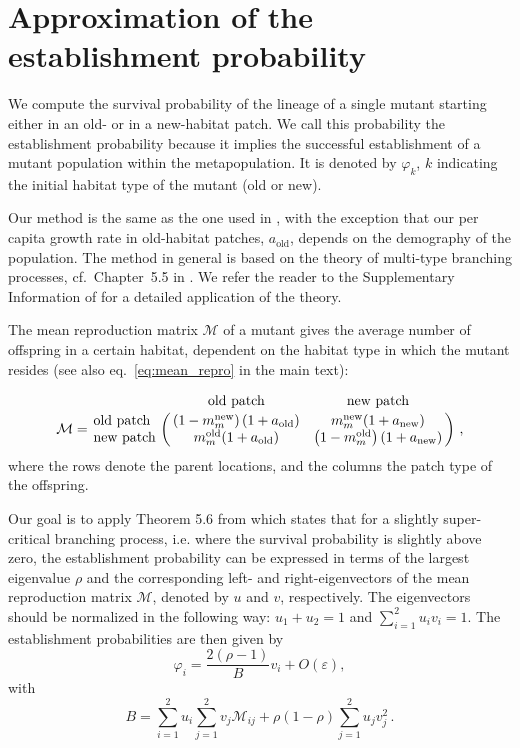 \documentclass[11pt]{article}
\newcommand{\chg}[1]{\textcolor{change}{#1}}
\begin{document}
\section{Approximation of the establishment probability\label{sec:approxestabproba}}
We compute the survival probability of the lineage of a single mutant starting either in an old- or in a new-habitat patch. We call this probability the establishment probability because it implies the successful establishment of a mutant population within the metapopulation. It is denoted by $\varphi_k$, $k$ indicating the initial habitat type of the mutant (old or new).

Our method is the same as the one used in \citet{tomasini_2018}, with the exception that our per capita growth rate in old-habitat patches, $a_{\text{old}}$, depends on the demography of the population. The method in general is based on the theory of multi-type branching processes, cf.~Chapter~5.5 in \citet{haccou_book}. We refer the reader to the Supplementary Information of \citet{tomasini_2018} for a detailed application of the theory. 

The mean reproduction matrix $\mathcal{M}$ of a mutant gives the average number of offspring in a certain habitat, dependent on the habitat type in which the mutant resides (see also eq.~\eqref{eq:mean_repro} in the main text):

\begin{equation}\label{Seq:mean_repro}
\mathcal{M} = \bordermatrix{ ~ & \text{old patch} & \text{new patch} \cr
	\text{old patch} & \left(1-m_m^{\text{new}}\right) (1+a_{\text{old}}) & m_m^{\text{new}} (1+a_{\text{new}}) \cr
	\text{new patch} & m_m^{\text{old}} (1+a_{\text{old}}) & \left(1-m_m^{\text{old}}\right) (1+a_{\text{new}})
}\ ,
\end{equation}
where the rows denote the parent locations, and the columns the patch type of the offspring.

Our goal is to apply Theorem 5.6 from \citet{haccou_book} which states that for a slightly super-critical branching process, \chg{i.e. where the survival probability is slightly above zero}, the establishment probability can be expressed in terms of the largest eigenvalue $\rho$ and the corresponding left- and right-eigenvectors of the mean reproduction matrix \chg{$\mathcal{M}$}, denoted by $u$ and $v$, respectively. The eigenvectors should be normalized in the following way: $u_1+u_2 = 1$ and $\sum_{i=1}^2 u_i v_i = 1$. The establishment probabilities are then given by 
\begin{equation}\label{Seq:theory}
\varphi_i = \frac{2(\rho-1)}{B} v_i + O(\varepsilon), 
\end{equation}
with
\begin{equation} 
B = \sum_{i=1}^2 u_i \sum_{j=1}^2 v_j \mathcal{M}_{ij} + \rho(1-\rho) \sum_{j=1}^2 u_j v_j^2\, . 
\end{equation} 
\end{document}
